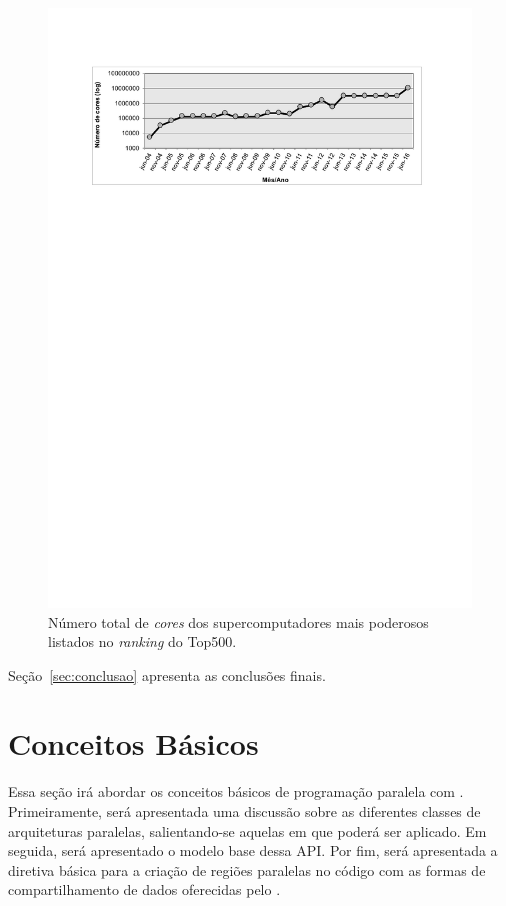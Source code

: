\documentclass{SBCbookchapter}
\begin{document}
	\begin{figure}[t]
		\centering
		\includegraphics[width=\linewidth]{img/cores-top500.pdf}
		\caption{Número total de \textit{cores} dos supercomputadores
		mais poderosos listados no \textit{ranking} do Top500.}
		\label{fig:top500}
	\end{figure}
	Seção~\ref{sec:conclusao} apresenta as conclusões finais.

\section{Conceitos Básicos}
\label{sec:conceitos basicos}

	Essa seção irá abordar os conceitos básicos de programação paralela
	com \openmp. Primeiramente, será apresentada uma discussão sobre as
	diferentes classes de arquiteturas paralelas, salientando-se aquelas
	em que \openmp poderá ser aplicado.	Em seguida, será apresentado o
	modelo base dessa API.  Por fim, será apresentada a diretiva básica
	para a criação de regiões paralelas no código com as formas de
	compartilhamento de dados oferecidas pelo \openmp.
\end{document}
